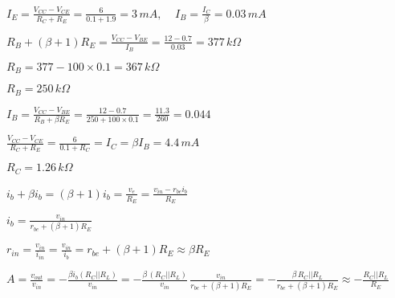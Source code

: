 \documentclass{article}
\def\lthtmlcheckvsize{\ifdim\ht\sizebox<\vsize 
  \ifdim\wd\sizebox<\hsize\expandafter\hfill\fi \expandafter\vfill
  \else\expandafter\vss\fi}%
\begin{document}
{\newpage\clearpage
{}%
$\displaystyle I_E=\frac{V_{CC}-V_{CE}}{R_C+R_E}=\frac{6}{0.1+1.9}=3\,mA,\;\;\;\;
I_B=\frac{I_C}{\beta}=0.03\,mA$%
\lthtmlindisplaymathZ
\lthtmlcheckvsize\clearpage}

{\newpage\clearpage
{}%
$\displaystyle R_B+(\beta+1)R_E=\frac{V_{CC}-V_{BE}}{I_B}=\frac{12-0.7}{0.03}=377\,k\Omega$%
\lthtmlindisplaymathZ
\lthtmlcheckvsize\clearpage}

{\newpage\clearpage
{}%
$\displaystyle R_B=377-100\times 0.1=367\,k\Omega$%
\lthtmlindisplaymathZ
\lthtmlcheckvsize\clearpage}

{\newpage\clearpage
{}%
$ R_B=250\,k\Omega$%
\lthtmlindisplaymathZ
\lthtmlcheckvsize\clearpage}

{\newpage\clearpage
{}%
$\displaystyle I_B=\frac{V_{CC}-V_{BE}}{R_B+\beta R_E}
=\frac{12-0.7}{250+100\times 0.1}=\frac{11.3}{260}=0.044$%
\lthtmlindisplaymathZ
\lthtmlcheckvsize\clearpage}

{\newpage\clearpage
{}%
$\displaystyle \frac{V_{CC}-V_{CE}}{R_C+R_E}=\frac{6}{0.1+R_C}=I_C=\beta I_B=4.4\,mA$%
\lthtmlindisplaymathZ
\lthtmlcheckvsize\clearpage}

{\newpage\clearpage
{}%
$ R_C=1.26\,k\Omega$%
\lthtmlindisplaymathZ
\lthtmlcheckvsize\clearpage}

{\newpage\clearpage
{}%
$\displaystyle i_b+\beta i_b=(\beta+1)i_b=\frac{v_e}{R_E}=\frac{v_{in}-r_{be}i_b}{R_E}$%
\lthtmlindisplaymathZ
\lthtmlcheckvsize\clearpage}

{\newpage\clearpage
{}%
$\displaystyle i_b=\frac{v_{in}}{r_{be}+(\beta+1)R_E}$%
\lthtmlindisplaymathZ
\lthtmlcheckvsize\clearpage}

{\newpage\clearpage
{}%
$\displaystyle r_{in}=\frac{v_{in}}{i_{in}}=\frac{v_{in}}{i_b}=r_{be}+(\beta+1)R_E
\approx \beta R_E$%
\lthtmlindisplaymathZ
\lthtmlcheckvsize\clearpage}

{\newpage\clearpage
{}%
$\displaystyle A=\frac{v_{out}}{v_{in}}=-\frac{\beta i_b (R_C||R_L)}{v_{in}}
=-\frac{\beta\,(R_C||R_L)}{v_{in}}\,\frac{v_{in}}{r_{be}+(\beta+1)R_E}
=-\frac{\beta\,R_C||R_L}{r_{be}+(\beta+1)R_E}
\approx -\frac{R_C||R_L}{R_E}$%
\lthtmlindisplaymathZ
\lthtmlcheckvsize\clearpage}
\end{document}
